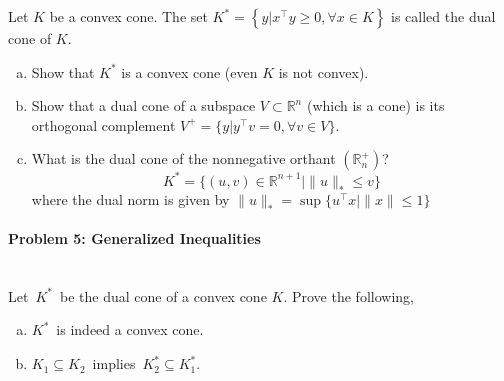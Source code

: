 \documentclass[a4paper]{article}
\newenvironment{solution}
{\color{blue} \paragraph{Solution.}}
{\newline \qed}
\begin{document}
\noindent
Let $K$ be a convex cone. The set $K^* = \left\{y|x^\top y \geq 0, \forall x\in K\right\}$ is called the dual cone of $K$.


\begin{enumerate}[a)]
	\item Show that $K^*$ is a convex cone (even $K$ is not convex).
	
	\item Show that a dual cone of a subspace $V \subset \mathbb{R}^n$ (which is a cone) is its orthogonal complement $V^+ = \{ y| y^\top v = 0, \forall v \in V\}$.
	
	\item What is the dual cone of the nonnegative orthant $(\mathbb{R}_n^+)$?
	$$
		K^* = \{(u,v) \in \mathbb{R}^{n+1} | \|u\|_* \leq v\}
	$$ 
	where the dual norm is given by $\|u\|_* =  \sup \{u^\top x | \|x\| \leq 1\}$
\end{enumerate}





\paragraph{Problem 5: Generalized Inequalities}
~\\

\noindent
Let~$K^*$~be the dual cone of a convex cone $K$. Prove the following,
\begin{enumerate}[a)]
    \item $K^*$~is indeed a convex cone.

    \item $K_1 \subseteq K_2$~implies~$K^*_2 \subseteq K^*_1$.
\end{enumerate}



\end{document}
